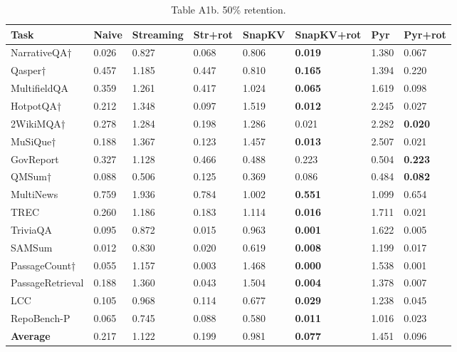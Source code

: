 \documentclass[10pt,letterpaper]{article}
\begin{document}
\begin{table}[H]
\centering
\small
\caption*{Table A1b. 50\% retention.}
\begin{tabular}{@{}llllllll@{}}
\toprule
Task & Naive & Streaming & Str+rot & SnapKV & SnapKV+rot & Pyr &
Pyr+rot\\
\midrule
NarrativeQA† & 0.026 & 0.827 & 0.068 & 0.806 & \textbf{0.019} & 1.380 & 0.067\\
Qasper† & 0.457 & 1.185 & 0.447 & 0.810 & \textbf{0.165} & 1.394 & 0.220\\
MultifieldQA & 0.359 & 1.261 & 0.417 & 1.024 & \textbf{0.065} & 1.619 & 0.098\\
HotpotQA† & 0.212 & 1.348 & 0.097 & 1.519 & \textbf{0.012} & 2.245 & 0.027\\
2WikiMQA† & 0.278 & 1.284 & 0.198 & 1.286 & 0.021 & 2.282 & \textbf{0.020}\\
MuSiQue† & 0.188 & 1.367 & 0.123 & 1.457 & \textbf{0.013} & 2.507 & 0.021\\
GovReport & 0.327 & 1.128 & 0.466 & 0.488 & 0.223 & 0.504 & \textbf{0.223}\\
QMSum† & 0.088 & 0.506 & 0.125 & 0.369 & 0.086 & 0.484 & \textbf{0.082}\\
MultiNews & 0.759 & 1.936 & 0.784 & 1.002 & \textbf{0.551} & 1.099 & 0.654\\
TREC & 0.260 & 1.186 & 0.183 & 1.114 & \textbf{0.016} & 1.711 & 0.021\\
TriviaQA & 0.095 & 0.872 & 0.015 & 0.963 & \textbf{0.001} & 1.622 & 0.005\\
SAMSum & 0.012 & 0.830 & 0.020 & 0.619 & \textbf{0.008} & 1.199 & 0.017\\
PassageCount† & 0.055 & 1.157 & 0.003 & 1.468 & \textbf{0.000} & 1.538 & 0.001\\
PassageRetrieval & 0.188 & 1.360 & 0.043 & 1.504 & \textbf{0.004} & 1.378 & 0.007\\
LCC & 0.105 & 0.968 & 0.114 & 0.677 & \textbf{0.029} & 1.238 & 0.045\\
RepoBench-P & 0.065 & 0.745 & 0.088 & 0.580 & \textbf{0.011} & 1.016 & 0.023\\
\textbf{Average} & 0.217 & 1.122 & 0.199 & 0.981 & \textbf{0.077} & 1.451 & 0.096\\
\bottomrule
\end{tabular}
\end{table}
\end{document}
